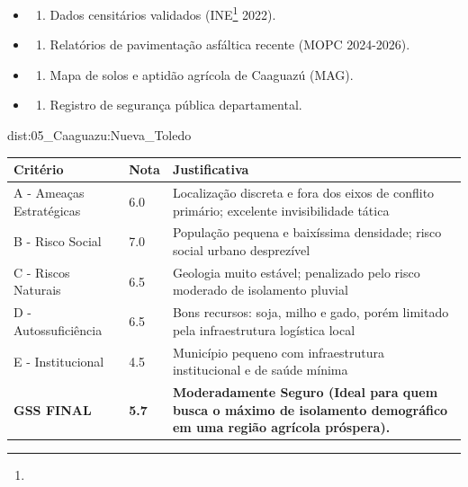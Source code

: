 {\begin{itemize}
\tightlist
\item
  \begin{enumerate}
  \def\labelenumi{\arabic{enumi})}
  \tightlist
  \item
    Dados censitários validados (INE\footnote{\fineINE} 2022).
  \end{enumerate}
\item
  \begin{enumerate}
  \def\labelenumi{\arabic{enumi})}
  \setcounter{enumi}{1}
  \tightlist
  \item
    Relatórios de pavimentação asfáltica recente (MOPC 2024-2026).
  \end{enumerate}
\item
  \begin{enumerate}
  \def\labelenumi{\arabic{enumi})}
  \setcounter{enumi}{2}
  \tightlist
  \item
    Mapa de solos e aptidão agrícola de Caaguazú (MAG).
  \end{enumerate}
\item
  \begin{enumerate}
  \def\labelenumi{\arabic{enumi})}
  \setcounter{enumi}{3}
  \tightlist
  \item
    Registro de segurança pública departamental.
  \end{enumerate}
\end{itemize}}{dist:05_Caaguazu:Nueva_Toledo}
\begin{table}[ht!]
\small \begin{tabular}{p{3.0cm}p{0.8cm}p{6.0cm}} \toprule
\textbf{Critério} & \textbf{Nota} & \textbf{Justificativa} \\ \midrule
A - Ameaças Estratégicas & 6.0 & Localização discreta e fora dos eixos de conflito primário; excelente invisibilidade tática \\
B - Risco Social & 7.0 & População pequena e baixíssima densidade; risco social urbano desprezível \\
C - Riscos Naturais & 6.5 & Geologia muito estável; penalizado pelo risco moderado de isolamento pluvial \\
D - Autossuficiência & 6.5 & Bons recursos: soja, milho e gado, porém limitado pela infraestrutura logística local \\
E - Institucional & 4.5 & Município pequeno com infraestrutura institucional e de saúde mínima \\
\midrule \textbf{GSS FINAL} & \textbf{5.7} & \textbf{Moderadamente Seguro (Ideal para quem busca o máximo de isolamento demográfico em uma região agrícola próspera).} \\ \bottomrule \end{tabular}
\end{table}

